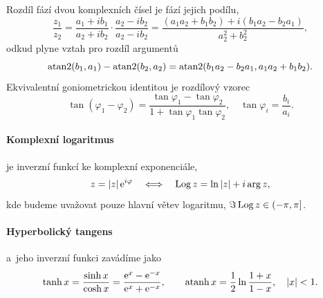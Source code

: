 Rozdíl fází dvou komplexních čísel je fází jejich podílu,
\begin{equation}
    \frac{z_1}{z_2}=\frac{a_1+ib_1}{a_2+ib_2}\cdot\frac{a_2-ib_2}{a_2-ib_2}=\frac{(a_1a_2+b_1b_2)+i(b_1a_2-b_2a_1)}{a_2^2+b_2^2},
\end{equation}
odkud plyne vztah pro rozdíl argumentů
\begin{equation}
    \operatorname{atan2}(b_1,a_1)-\operatorname{atan2}(b_2,a_2)=\operatorname{atan2}(b_1a_2-b_2a_1,a_1a_2+b_1b_2).
\end{equation}
Ekvivalentní goniometrickou identitou je rozdílový vzorec
\begin{equation}\label{eq:atantwo_diff}
    \tan(\varphi_1-\varphi_2)=\frac{\tan\varphi_1-\tan\varphi_2}{1+\tan\varphi_1\tan\varphi_2},\quad \tan\varphi_i=\frac{b_i}{a_i}.
\end{equation}

\paragraph{Komplexní logaritmus} je inverzní funkcí ke komplexní exponenciále,
\begin{equation}\label{eq:complex_log_deff}
    z=\left\lvert z\right\rvert\mathrm{e}^{i\varphi}\quad\Longleftrightarrow\quad \operatorname{Log}{z}=\ln{\left\lvert z\right\rvert}+i\arg{z},
\end{equation}
kde budeme uvažovat pouze hlavní větev logaritmu, $\Im\operatorname{Log}{z}\in(-\pi,\pi]$.

\paragraph{Hyperbolický tangens} a~jeho inverzní funkci zavádíme jako
\begin{equation}\label{eq:tanh_atanh_deff}
    \tanh{x}=\frac{\sinh{x}}{\cosh{x}}=\frac{\mathrm{e}^{x}-\mathrm{e}^{-x}}{\mathrm{e}^{x}+\mathrm{e}^{-x}},\qquad \operatorname{atanh}{x}=\frac{1}{2}\ln\frac{1+x}{1-x},\quad\left\lvert x\right\rvert<1.
\end{equation}

